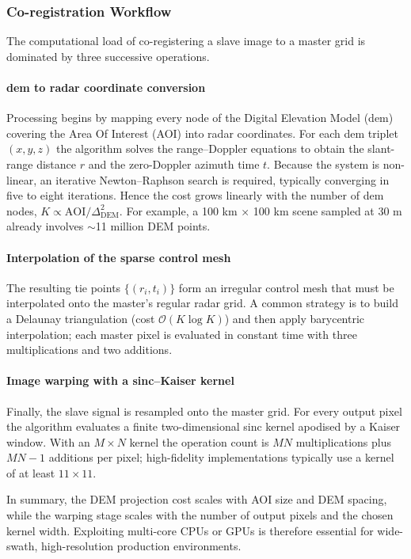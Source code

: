 \subsubsection{Co-registration Workflow}

The computational load of co-registering a slave image to a master grid is dominated by three successive operations.

\paragraph{\acs{dem} to radar coordinate conversion}  
Processing begins by mapping every node of the Digital Elevation Model (\acs{dem}) covering the Area Of Interest (AOI) into radar coordinates.  
For each \acs{dem} triplet $(x,y,z)$ the algorithm solves the range–Doppler equations to obtain the slant-range distance $r$ and the zero-Doppler azimuth time $t$.  
Because the system is non-linear, an iterative Newton–Raphson search is required, typically converging in five to eight iterations.  
Hence the cost grows linearly with the number of \acs{dem} nodes, $K\!\propto\!\text{AOI}/\Delta_{\text{DEM}}^{2}$.  
For example, a 100 km × 100 km scene sampled at 30 m already involves $\sim$11 million DEM points.

\paragraph{Interpolation of the sparse control mesh}  
The resulting tie points $\{(r_i,t_i)\}$ form an irregular control mesh that must be interpolated onto the master’s regular radar grid.  
A common strategy is to build a Delaunay triangulation (cost $\mathcal{O}(K\log K)$) and then apply barycentric interpolation; each master pixel is evaluated in constant time with three multiplications and two additions.


\paragraph{Image warping with a sinc–Kaiser kernel}  
Finally, the slave signal is resampled onto the master grid.  
For every output pixel the algorithm evaluates a finite two-dimensional sinc kernel apodised by a Kaiser window.  
With an \(M\times N\) kernel the operation count is \(MN\) multiplications plus \(MN-1\) additions per pixel; high-fidelity implementations typically use a kernel of at least \(11\times11\).

\bigskip
\noindent
In summary, the DEM projection cost scales with AOI size and DEM spacing, while the warping stage scales with the number of output pixels and the chosen kernel width.  Exploiting multi-core CPUs or GPUs is therefore essential for wide-swath, high-resolution production environments.

